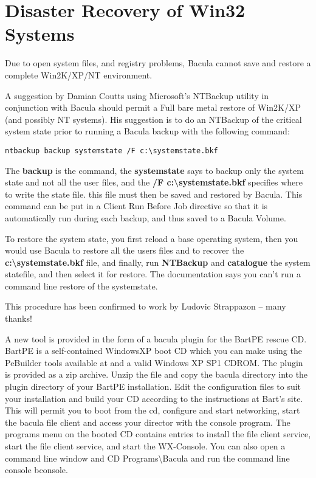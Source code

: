 \label{Win3233}
\section{Disaster Recovery of Win32 Systems}

Due to open system files, and registry problems, Bacula cannot save and
restore a complete Win2K/XP/NT environment. 

A suggestion by Damian Coutts using Microsoft's NTBackup utility in
conjunction with Bacula should permit a Full bare metal restore of Win2K/XP
(and possibly NT systems). His suggestion is to do an NTBackup of the critical
system state prior to running a Bacula backup with the following command: 

\footnotesize
\begin{verbatim}
ntbackup backup systemstate /F c:\systemstate.bkf
\end{verbatim}
\normalsize

The {\bf backup} is the command, the {\bf systemstate} says to backup only the
system state and not all the user files, and the {\bf /F
c:\textbackslash{}systemstate.bkf} specifies where to write the state file.
this file must then be saved and restored by Bacula. This command
can be put in a Client Run Before Job directive so that it is automatically
run during each backup, and thus saved to a Bacula Volume.

To restore the system state, you first reload a base operating system, then
you would use Bacula to restore all the users files and to recover the {\bf
c:\textbackslash{}systemstate.bkf} file, and finally, run {\bf NTBackup} and
{\bf catalogue} the system statefile, and then select it for restore. The
documentation says you can't run a command line restore of the systemstate. 

This procedure has been confirmed to work by Ludovic Strappazon -- many
thanks! 

A new tool is provided in the form of a bacula plugin for the BartPE rescue
CD. BartPE is a self-contained WindowsXP boot CD which you can make using the
PeBuilder tools available at 
 and a valid
Windows XP SP1 CDROM. The plugin is provided as a zip archive. Unzip the file
and copy the bacula directory into the plugin directory of your BartPE
installation. Edit the configuration files to suit your installation and build
your CD according to the instructions at Bart's site. This will permit you to
boot from the cd, configure and start networking, start the bacula file client
and access your director with the console program. The programs menu on the
booted CD contains entries to install the file client service, start the file
client service, and start the WX-Console. You can also open a command line
window and CD Programs\textbackslash{}Bacula and run the command line console
bconsole. 

